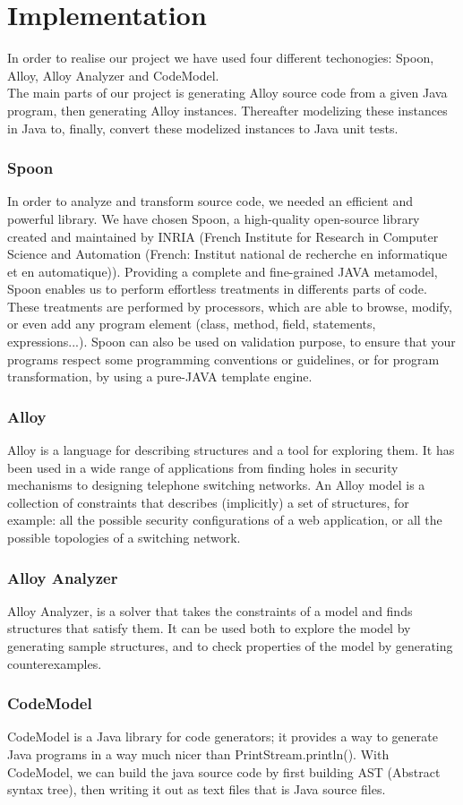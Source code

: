 \section{Implementation}
\label{sec:Implementation}
In order to realise our project we have used four different techonogies: Spoon, Alloy, Alloy Analyzer and CodeModel.\\
The main parts of our project is generating Alloy source code from a given Java program, then generating Alloy instances. Thereafter modelizing these instances in Java to, finally, convert these modelized instances to Java unit tests.

\subsubsection{Spoon}
\label{subsec:impl}
In order to analyze and transform source code, we needed an efficient and powerful library.
We have chosen Spoon, a high-quality open-source library created and maintained by INRIA
(French Institute for Research in Computer Science and Automation (French: Institut national
de recherche en informatique et en automatique)). Providing a complete and fine-grained
JAVA metamodel, Spoon enables us to perform effortless treatments in differents parts of code.
These treatments are performed by processors, which are able to browse, modify, or even add
any program element (class, method, field, statements, expressions...).\cite{spoon-gforge}\cite{spoon-hal}
Spoon can also be used on validation purpose, to ensure that your programs respect some
programming conventions or guidelines, or for program transformation, by using a pure-JAVA
template engine.\cite{spoon-javasource}
\subsubsection{Alloy}
Alloy is a language for describing structures and a tool for exploring them. It has been used in a wide range of applications from finding holes in security mechanisms to designing telephone switching networks.
An Alloy model is a collection of constraints that describes (implicitly) a set of structures, for example: all the possible security configurations of a web application, or all the possible topologies of a switching network.\cite{alloy}

\subsubsection{Alloy Analyzer}
Alloy Analyzer, is a solver that takes the constraints of a model and finds structures that satisfy them. It can be used both to explore the model by generating sample structures, and to check properties of the model by generating counterexamples.\cite{alloy}

\subsubsection{CodeModel}
CodeModel is a Java library for code generators; it provides a way to generate Java programs in a way much nicer than PrintStream.println().
With CodeModel, we can build the java source code by first building AST (Abstract syntax tree)\cite{ast}, then writing it out as text files that is Java source files.\cite{codeModel}